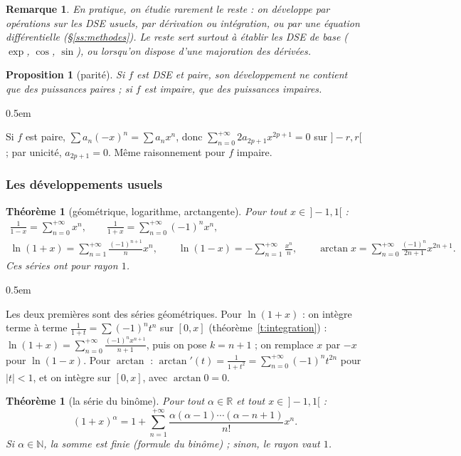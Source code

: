 \documentclass[a4paper,11pt]{article}
\makeatletter
\numberwithin{equation}{section}
\numberwithin{figure}{section}
\numberwithin{table}{section}
\theoremstyle{enonce}
\newtheorem{theoreme}[definition]{Théorème}
\newtheorem{proposition}[definition]{Proposition}
\theoremstyle{exemple}
\theoremstyle{remarque}
\newtheorem*{remarque}{Remarque}
\renewcommand{\proofname}{Démonstration}
\renewenvironment{proof}[1][\proofname]{\par\pushQED{\qed}\normalfont
  \topsep0.5em\relax\trivlist\item[\hskip\labelsep\sffamily\itshape\color{Gris}#1.]\ignorespaces}
  {\popQED\endtrivlist\@endpefalse}
\newcommand{\R}{\mathbb{R}}
\newcommand{\N}{\mathbb{N}}
\makeatother
\begin{document}
\begin{remarque}
En pratique, on étudie rarement le reste : on développe par opérations sur les DSE usuels, par dérivation ou intégration, ou par
une équation différentielle (§\ref{ss:methodes}). Le reste sert surtout à établir les DSE de base ($\exp$, $\cos$, $\sin$), ou
lorsqu'on dispose d'une majoration des dérivées.
\end{remarque}

\begin{proposition}[parité]\label{p:parite}
Si $f$ est DSE et paire, son développement ne contient que des puissances paires ; si $f$ est impaire, que des puissances impaires.
\end{proposition}

\begin{proof}
Si $f$ est paire, $\sum a_n(-x)^n=\sum a_nx^n$, donc $\sum_{n=0}^{+\infty}2a_{2p+1}x^{2p+1}=0$ sur $]-r,r[$ ; par unicité,
$a_{2p+1}=0$. Même raisonnement pour $f$ impaire.
\end{proof}

\subsubsection*{Les développements usuels}

\begin{theoreme}[géométrique, logarithme, arctangente]\label{t:usuels1}
Pour tout $x\in\,]-1,1[$ :
\begin{gather*}\frac1{1-x}=\sum_{n=0}^{+\infty}x^n,\qquad\frac1{1+x}=\sum_{n=0}^{+\infty}(-1)^nx^n,\\
\ln(1+x)=\sum_{n=1}^{+\infty}\frac{(-1)^{n+1}}nx^n,\qquad\ln(1-x)=-\sum_{n=1}^{+\infty}\frac{x^n}n,\qquad
\arctan x=\sum_{n=0}^{+\infty}\frac{(-1)^n}{2n+1}x^{2n+1}.\end{gather*}
Ces séries ont pour rayon $1$.
\end{theoreme}

\begin{proof}
Les deux premières sont des séries géométriques. Pour $\ln(1+x)$ : on intègre terme à terme $\frac1{1+t}=\sum(-1)^nt^n$ sur $[0,x]$
(théorème~\ref{t:integration}) : $\ln(1+x)=\sum_{n=0}^{+\infty}\frac{(-1)^nx^{n+1}}{n+1}$, puis on pose $k=n+1$ ; on remplace $x$ par $-x$
pour $\ln(1-x)$. Pour $\arctan$ : $\arctan'(t)=\frac1{1+t^2}=\sum_{n=0}^{+\infty}(-1)^nt^{2n}$ pour $|t|<1$, et on intègre sur $[0,x]$,
avec $\arctan0=0$.
\end{proof}

\begin{theoreme}[la série du binôme]\label{t:binome}
Pour tout $\alpha\in\R$ et tout $x\in\,]-1,1[$ :
\[(1+x)^\alpha=1+\sum_{n=1}^{+\infty}\frac{\alpha(\alpha-1)\cdots(\alpha-n+1)}{n!}x^n.\]
Si $\alpha\in\N$, la somme est finie (formule du binôme) ; sinon, le rayon vaut $1$.
\end{theoreme}
\end{document}

